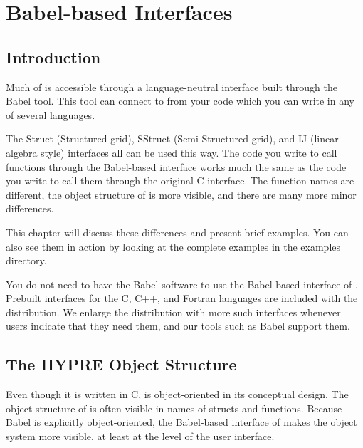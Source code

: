 
\chapter{Babel-based Interfaces}
\label{ch-babel}

\section{Introduction}

Much of \hypre{} is accessible through a language-neutral interface
built through the Babel tool.  This tool can connect to \hypre{} from
your code which you can write in any of several languages.

The Struct (Structured grid), SStruct (Semi-Structured grid), and IJ
(linear algebra style) interfaces all can be used
this way.  The code you write to call \hypre{} functions through the
Babel-based interface works much the same as the code you write to
call them through the original C interface.  The function names are
different, the object structure of \hypre{} is more visible, and there
are many more minor differences.

This chapter will discuss these differences and present brief
examples.  You can also see them in action by looking at the complete examples
in the examples directory.

You do not need to have the Babel software to use the Babel-based
interface of \hypre{}.  Prebuilt interfaces for the C, C++, and
Fortran languages are included with the \hypre{} distribution.  We
enlarge the distribution with more such interfaces whenever \hypre{}
users indicate that they need them, and our tools such as Babel
support them.


\section{The HYPRE Object Structure}

Even though it is written in C, \hypre{} is object-oriented in its
conceptual design.  The object structure of \hypre{} is often visible
in names of structs and functions.  Because Babel is explicitly
object-oriented, the Babel-based interface of \hypre{} makes the
\hypre{} object system more visible, at least at the level of the
user interface.

